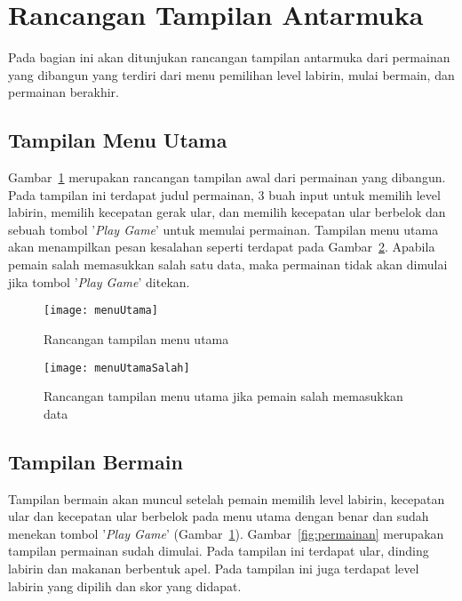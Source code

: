 \begin{enumerate}
\end{enumerate} 

\section{Rancangan Tampilan Antarmuka}
Pada bagian ini akan ditunjukan rancangan tampilan antarmuka dari permainan yang dibangun yang terdiri dari menu pemilihan level labirin, mulai bermain, dan permainan berakhir.

\subsection{Tampilan Menu Utama}
Gambar~\ref{fig:menuUtama} merupakan rancangan tampilan awal dari permainan yang dibangun. Pada tampilan ini terdapat judul permainan, 3 buah input untuk memilih level labirin, memilih kecepatan gerak ular, dan memilih kecepatan ular berbelok dan sebuah tombol '\textit{Play Game}' untuk memulai permainan. Tampilan menu utama akan menampilkan pesan kesalahan seperti terdapat pada Gambar~\ref{fig:menuUtamaSalah}. Apabila pemain salah memasukkan salah satu data, maka permainan tidak akan dimulai jika tombol '\textit{Play Game}' ditekan.

\begin{figure}[H]
	\centering  
	\texttt{[image: menuUtama]}  
	\caption[Rancangan tampilan menu utama]{Rancangan tampilan menu utama}
	\label{fig:menuUtama} 
\end{figure}

\begin{figure}[H]
	\centering  
	\texttt{[image: menuUtamaSalah]}  
	\caption[Rancangan tampilan menu utama jika pemain salah memasukkan data]{Rancangan tampilan menu utama jika pemain salah memasukkan data}
	\label{fig:menuUtamaSalah} 
\end{figure}

\subsection{Tampilan Bermain}
Tampilan bermain akan muncul setelah pemain memilih level labirin, kecepatan ular dan kecepatan ular berbelok pada menu utama dengan benar dan sudah menekan tombol '\textit{Play Game}' (Gambar~\ref{fig:menuUtama}). Gambar~\ref{fig:permainan} merupakan tampilan permainan sudah dimulai. Pada tampilan ini terdapat ular, dinding labirin dan makanan berbentuk apel. Pada tampilan ini juga terdapat level labirin yang dipilih dan skor yang didapat. 


